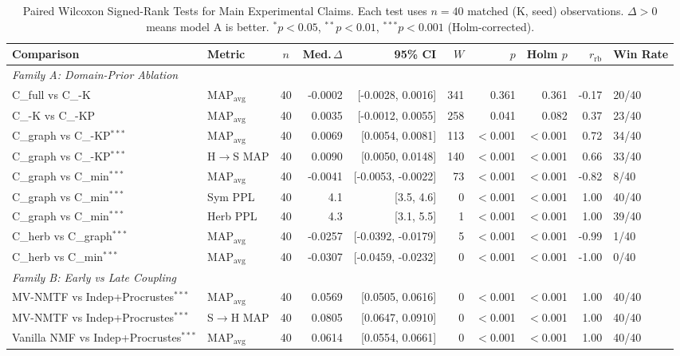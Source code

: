 \begin{table}[t]
\centering
\caption{Paired Wilcoxon Signed-Rank Tests for Main Experimental Claims. Each test uses $n{=}40$ matched (K, seed) observations. $\Delta{>}0$ means model A is better. $^{*}p{<}0.05$, $^{**}p{<}0.01$, $^{***}p{<}0.001$ (Holm-corrected).}
\label{tab:wilcoxon}
\small
\begin{tabular}{llcrrrrrrl}
\toprule
Comparison & Metric & $n$ & Med.\,$\Delta$ & 95\% CI & $W$ & $p$ & Holm $p$ & $r_{\text{rb}}$ & Win Rate \\
\midrule
\multicolumn{10}{l}{\textit{Family A: Domain-Prior Ablation}} \\
\midrule
C_full vs C_-K & MAP$_{\text{avg}}$ & 40 & -0.0002 & [-0.0028, 0.0016] & 341 & 0.361 & 0.361 & -0.17 & 20/40 \\
C_-K vs C_-KP & MAP$_{\text{avg}}$ & 40 & 0.0035 & [-0.0012, 0.0055] & 258 & 0.041 & 0.082 & 0.37 & 23/40 \\
C_graph vs C_-KP$^{***}$ & MAP$_{\text{avg}}$ & 40 & 0.0069 & [0.0054, 0.0081] & 113 & $<$0.001 & $<$0.001 & 0.72 & 34/40 \\
C_graph vs C_-KP$^{***}$ & H$\to$S MAP & 40 & 0.0090 & [0.0050, 0.0148] & 140 & $<$0.001 & $<$0.001 & 0.66 & 33/40 \\
C_graph vs C_min$^{***}$ & MAP$_{\text{avg}}$ & 40 & -0.0041 & [-0.0053, -0.0022] & 73 & $<$0.001 & $<$0.001 & -0.82 & 8/40 \\
C_graph vs C_min$^{***}$ & Sym PPL & 40 & 4.1 & [3.5, 4.6] & 0 & $<$0.001 & $<$0.001 & 1.00 & 40/40 \\
C_graph vs C_min$^{***}$ & Herb PPL & 40 & 4.3 & [3.1, 5.5] & 1 & $<$0.001 & $<$0.001 & 1.00 & 39/40 \\
C_herb vs C_graph$^{***}$ & MAP$_{\text{avg}}$ & 40 & -0.0257 & [-0.0392, -0.0179] & 5 & $<$0.001 & $<$0.001 & -0.99 & 1/40 \\
C_herb vs C_min$^{***}$ & MAP$_{\text{avg}}$ & 40 & -0.0307 & [-0.0459, -0.0232] & 0 & $<$0.001 & $<$0.001 & -1.00 & 0/40 \\
\midrule
\multicolumn{10}{l}{\textit{Family B: Early vs Late Coupling}} \\
\midrule
MV-NMTF vs Indep+Procrustes$^{***}$ & MAP$_{\text{avg}}$ & 40 & 0.0569 & [0.0505, 0.0616] & 0 & $<$0.001 & $<$0.001 & 1.00 & 40/40 \\
MV-NMTF vs Indep+Procrustes$^{***}$ & S$\to$H MAP & 40 & 0.0805 & [0.0647, 0.0910] & 0 & $<$0.001 & $<$0.001 & 1.00 & 40/40 \\
Vanilla NMF vs Indep+Procrustes$^{***}$ & MAP$_{\text{avg}}$ & 40 & 0.0614 & [0.0554, 0.0661] & 0 & $<$0.001 & $<$0.001 & 1.00 & 40/40 \\

\end{tabular}
\end{table}
